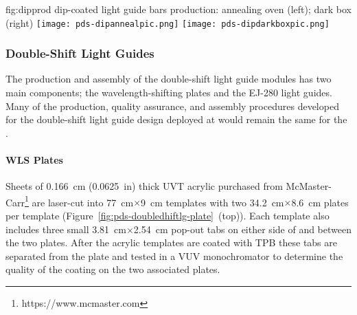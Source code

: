 \begin{dunefigure}{fig:dipprod}
{ dip-coated light guide bars production: annealing oven (left); dark box (right)}
  \texttt{[image: pds-dipannealpic.png]}
  \texttt{[image: pds-dipdarkboxpic.png]}
\end{dunefigure}




\subsubsection{Double-Shift Light Guides}
\label{ssec:fdsp-pd-pc-prod-bar2}

The production and assembly of the double-shift light guide modules has two main components; the wavelength-shifting plates and the EJ-280 light guides. Many of the production, quality assurance, and assembly procedures developed for the double-shift light guide design deployed at  would remain the same for the  .
													
\paragraph*{WLS Plates}

Sheets of \SI{0.166}{cm} (\SI{0.0625}{in}) thick UVT acrylic purchased from McMaster-Carr\footnote{https://www.mcmaster.com} are laser-cut into \SI{77}{cm}$\times$\SI{9}{cm} templates with two \SI{34.2}{cm}$\times$\SI{8.6}{cm} plates per template (Figure~\ref{fig:pds-doubledhiftlg-plate}~(top)). Each template also includes three small \SI{3.81}{cm}$\times$\SI{2.54}{cm} pop-out tabs on either side of and between the two plates. After the acrylic templates are coated with TPB these tabs are separated from the plate and tested in a VUV monochromator to determine the quality of the coating on the two associated plates.

